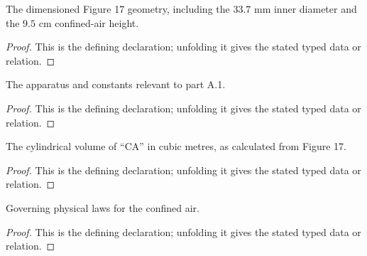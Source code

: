 \begin{definition}
  \label{decl:physics:IPhO_2026_4_A_1:Figure17Geometry}
  The dimensioned Figure 17 geometry, including the \(33.7\) mm inner diameter and the \(9.5\) cm confined-air height.
\end{definition}
\begin{proof}
  This is the defining declaration; unfolding it gives the stated typed data or relation.
\end{proof}

\begin{definition}[IsochoricAirSetup]
  \label{decl:physics:IPhO_2026_4_A_1:IsochoricAirSetup}
  The apparatus and constants relevant to part A.1.
\end{definition}
\begin{proof}
  This is the defining declaration; unfolding it gives the stated typed data or relation.
\end{proof}

\begin{definition}[cylindricalAirVolumeSI]
  \label{decl:physics:IPhO_2026_4_A_1:cylindricalAirVolumeSI}
  The cylindrical volume of “CA” in cubic metres, as calculated from Figure 17.
\end{definition}
\begin{proof}
  This is the defining declaration; unfolding it gives the stated typed data or relation.
\end{proof}

\begin{definition}[GoverningLaws]
  \label{decl:physics:IPhO_2026_4_A_1:GoverningLaws}
  Governing physical laws for the confined air.
\end{definition}
\begin{proof}
  This is the defining declaration; unfolding it gives the stated typed data or relation.
\end{proof}

